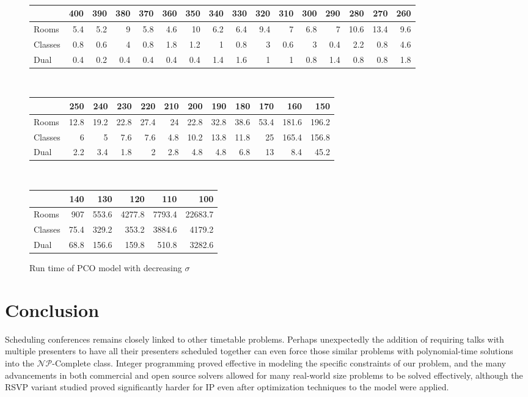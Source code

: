 \documentclass[]{article}
\theoremstyle{definition}
\theoremstyle{remark}
\numberwithin{equation}{section}
\newcommand{\cNP}{$\mathcal{NP}$}
\begin{document}
\begin{figure}[h!]
	\caption{Run time of PCO model with decreasing $\sigma$}
	\centering
	 \\
	\begin{tabular}{| l | r | r | r | r | r | r | r | r | r | r | r | r | r | r | r |}
		\hline
		& 400 & 390	 & 380  & 370 & 360 & 350 & 340 & 330 & 320 & 310 & 300 & 290 & 280 & 270 & 260 \\
		\hline
		Rooms & 5.4 & 5.2 & 9 & 5.8 & 4.6 & 10 & 6.2 & 6.4 & 9.4 & 7 & 6.8 & 7 & 10.6 & 13.4 & 9.6 \\
		\hline
		Classes & 0.8 & 0.6 & 4 & 0.8 & 1.8 & 1.2 & 1 & 0.8 & 3 & 0.6 & 3 & 0.4 & 2.2 & 0.8 & 4.6 \\
		\hline
		Dual & 0.4 & 0.2 & 0.4 & 0.4 & 0.4 & 0.4 & 1.4 & 1.6 & 1 & 1 & 0.8 & 1.4 & 0.8 & 0.8 & 1.8 \\
		\hline
	\end{tabular} \\
	\hfill \break
	\begin{tabular}{| l | r | r | r | r | r | r | r | r | r | r | r |}
		\hline
		& 250 & 240 & 230 & 220 & 210 & 200 & 190 & 180 & 170 & 160 & 150 \\
		\hline
		Rooms & 12.8 & 19.2 & 22.8 & 27.4 & 24 & 22.8 & 32.8 & 38.6 & 53.4 & 181.6 & 196.2 \\
		\hline
		Classes & 6 & 5 & 7.6 & 7.6 & 4.8 & 10.2 & 13.8 & 11.8 & 25 & 165.4 & 156.8 \\
		\hline
		Dual & 2.2 & 3.4 & 1.8 & 2 & 2.8 & 4.8 & 4.8 & 6.8 & 13 & 8.4 & 45.2 \\
		\hline	
	\end{tabular} \\
	\hfill \break
	\begin{tabular}{| l | r | r | r | r | r |}
		\hline
		& 140 & 130 & 120 & 110 & 100 \\
		\hline
		Rooms & 907 & 553.6 & 4277.8 & 7793.4 & 22683.7 \\
		\hline
		Classes & 75.4 & 329.2 & 353.2 & 3884.6 & 4179.2 \\
		\hline
		Dual & 68.8 & 156.6 & 159.8 & 510.8 & 3282.6 \\
		\hline
	\end{tabular}
	\label{2013_normal_sigma_run_time}
\end{figure}

\section{Conclusion}\label{sec.conclusion}
Scheduling conferences remains closely linked to other timetable problems. Perhaps unexpectedly the addition of requiring talks with multiple presenters to have all their presenters scheduled together can even force those similar problems with polynomial-time solutions into the \cNP-Complete class. Integer programming proved effective in modeling the specific constraints of our problem, and the many advancements in both commercial and open source solvers allowed for many real-world size problems to be solved effectively, although the RSVP variant studied proved significantly harder for IP even after optimization techniques to the model were applied.
\end{document}
